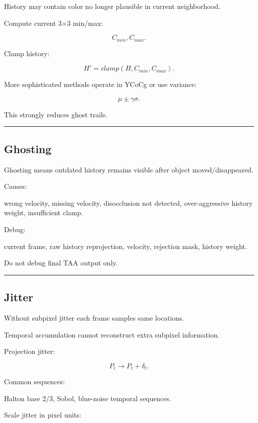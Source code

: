 History may contain color no longer plausible in current neighborhood.

Compute current 3×3 min/max:

\[
C_{min},C_{max}.
\]

Clamp history:

\[
\boxed{
H'
=
clamp(
H,
C_{min},
C_{max}
).
}
\]

More sophisticated methods operate in YCoCg or use variance:

\[
\mu\pm\gamma\sigma.
\]

This strongly reduces ghost trails.

\begin{center}\rule{0.5\linewidth}{0.5pt}\end{center}

\subsection{Ghosting}\label{04-visual-computing-ii-ch040-ghosting}

Ghosting means outdated history remains visible after object moved/disappeared.

Causes:

wrong velocity, missing velocity, disocclusion not detected, over-aggressive history weight, insufficient clamp.

Debug:

current frame, raw history reprojection, velocity, rejection mask, history weight.

Do not debug final TAA output only.

\begin{center}\rule{0.5\linewidth}{0.5pt}\end{center}

\subsection{Jitter}\label{04-visual-computing-ii-ch040-jitter}

Without subpixel jitter each frame samples same locations.

Temporal accumulation cannot reconstruct extra subpixel information.

Projection jitter:

\[
P_t
\rightarrow
P_t+\delta_t.
\]

Common sequences:

Halton base 2/3, Sobol, blue-noise temporal sequences.

Scale jitter in pixel units:

